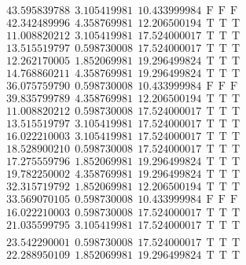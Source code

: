 \documentclass[10pt,a4paper]{article}
\begin{document}
\begin{itemize}
\begin{displaymath}
{\begin{aligned}
&43.595839788 ~~   3.105419981 ~~  10.433999984  ~~\mathrm{F  ~~ F  ~~  F} \\ 
&42.342489996 ~~   4.358769981 ~~  12.206500194  ~~\mathrm{T  ~~ T  ~~ T } \\ 
&11.008820212 ~~   3.105419981 ~~  17.524000017  ~~\mathrm{T  ~~ T  ~~ T } \\ 
&13.515519797 ~~   0.598730008 ~~  17.524000017  ~~\mathrm{T  ~~ T  ~~ T } \\ 
&12.262170005 ~~   1.852069981 ~~  19.296499824  ~~\mathrm{T  ~~ T  ~~ T } \\ 
&14.768860211 ~~   4.358769981 ~~  19.296499824  ~~\mathrm{T  ~~ T  ~~ T } \\ 
&36.075759790 ~~   0.598730008 ~~  10.433999984  ~~\mathrm{F  ~~ F  ~~  F} \\ 
&39.835799789 ~~   4.358769981 ~~  12.206500194  ~~\mathrm{T  ~~ T  ~~ T } \\ 
&11.008820212 ~~   0.598730008 ~~  17.524000017  ~~\mathrm{T  ~~ T  ~~ T } \\ 
&13.515519797 ~~   3.105419981 ~~  17.524000017  ~~\mathrm{T  ~~ T  ~~ T } \\ 
&16.022210003 ~~   3.105419981 ~~  17.524000017  ~~\mathrm{T  ~~ T  ~~ T } \\ 
&18.528900210 ~~   0.598730008 ~~  17.524000017  ~~\mathrm{T  ~~ T  ~~ T } \\ 
&17.275559796 ~~   1.852069981 ~~  19.296499824  ~~\mathrm{T  ~~ T  ~~ T } \\ 
&19.782250002 ~~   4.358769981 ~~  19.296499824  ~~\mathrm{T  ~~ T  ~~ T } \\ 
&32.315719792 ~~   1.852069981 ~~  12.206500194  ~~\mathrm{T  ~~ T  ~~ T } \\ 
&33.569070105 ~~   0.598730008 ~~  10.433999984  ~~\mathrm{F  ~~ F  ~~  F} \\ 
&16.022210003 ~~   0.598730008 ~~  17.524000017  ~~\mathrm{T  ~~ T  ~~ T } \\ 
&21.035599795 ~~   3.105419981 ~~  17.524000017  ~~\mathrm{T  ~~ T  ~~ T } \\ 
				\end{aligned}
			}
		\end{displaymath}
		\begin{displaymath}
			\boxed{
				\begin{aligned}
&23.542290001 ~~   0.598730008 ~~  17.524000017  ~~\mathrm{T  ~~ T  ~~ T } \\ 
&22.288950109 ~~   1.852069981 ~~  19.296499824  ~~\mathrm{T  ~~ T  ~~ T } \\ 

\end{aligned}}
\end{displaymath}
\end{itemize}
\end{document}
